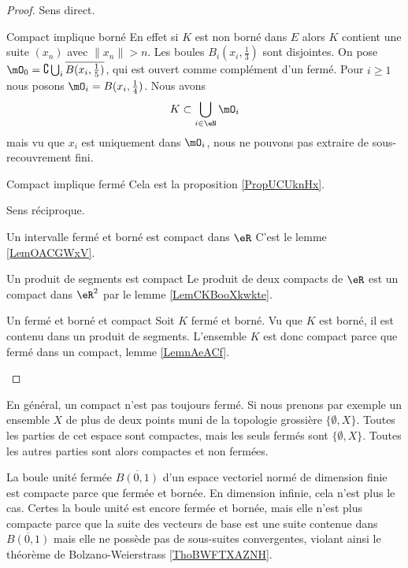 \begin{proof}
    Sens direct.
    \begin{subproof}
    \item[Compact implique borné]
        En effet si \( K\) est non borné dans \( E\) alors \( K\) contient une suite \( (x_n)\) avec \( \| x_n \|>n\). Les boules \( B_i(x_i,\frac{ 1 }{3})\) sont disjointes. On pose \( \mO_0=\complement\bigcup_i\overline{ B(x_i,\frac{1}{ 5 }) }\), qui est ouvert comme complément d'un fermé. Pour \( i\geq 1\) nous posons \( \mO_i=B(x_i,\frac{1}{ 4 })\). Nous avons
        \begin{equation}
            K\subset\bigcup_{i\in \eN}\mO_i
        \end{equation}
        mais vu que \( x_i\) est uniquement dans \( \mO_i\), nous ne pouvons pas extraire de sous-recouvrement fini.
    \item[Compact implique fermé]
        Cela est la proposition \ref{PropUCUknHx}.
    \end{subproof}
    Sens réciproque.
    \begin{subproof}
    \item[Un intervalle fermé et borné est compact dans \( \eR\)]
        C'est le lemme \ref{LemOACGWxV}.
    \item[Un produit de segments est compact]
        Le produit de deux compacts de \( \eR\) est un compact dans \( \eR^2\) par le lemme \ref{LemCKBooXkwkte}.
    \item[Un fermé et borné et compact]
        Soit \( K\) fermé et borné. Vu que \( K\) est borné, il est contenu dans un produit de segments. L'ensemble \( K\) est donc compact parce que fermé dans un compact, lemme \ref{LemnAeACf}.
    \end{subproof}
\end{proof}

\begin{example}
    En général, un compact n'est pas toujours fermé. Si nous prenons par exemple un ensemble \( X\) de plus de deux points muni de la topologie grossière \( \{ \emptyset,X \}\). Toutes les parties de cet espace sont compactes, mais les seuls fermés sont \( \{ \emptyset,X \}\). Toutes les autres parties sont alors compactes et non fermées.
\end{example}

\begin{example}
    La boule unité fermée \( \overline{ B(0,1) }\) d'un espace vectoriel normé de dimension finie est compacte parce que fermée et bornée. En dimension infinie, cela n'est plus le cas. Certes la boule unité est encore fermée et bornée, mais elle n'est plus compacte parce que la suite des vecteurs de base est une suite contenue dans \( \overline{ B(0,1) }\) mais elle ne possède pas de sous-suites convergentes, violant ainsi le théorème de Bolzano-Weierstrass \ref{ThoBWFTXAZNH}.
\end{example}

